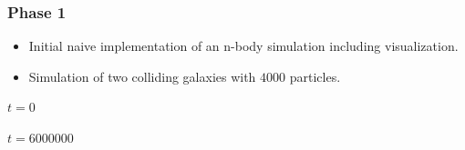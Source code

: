\begin{frame}[fragile, c]
  \frametitle{Phase 1}
  \begin{itemize}
      \item Initial naive implementation of an n-body simulation including visualization.
      \item Simulation of two colliding galaxies with $\num{4000}$ particles.
  \end{itemize}
  \vspace*{-0.5em}
  \begin{figure}
      \centering
      \hspace{1em}
      \DisplayRightArrow
      \hspace{1em}
  \end{figure}
  \vspace*{-.5em}
  \begin{minipage}{.47\textwidth}
    \centering
    $t = \num{0}$
  \end{minipage}
  \hfill
  \begin{minipage}{.47\textwidth}
    \centering
    $t = \num{6000000}$
  \end{minipage}
\end{frame}

